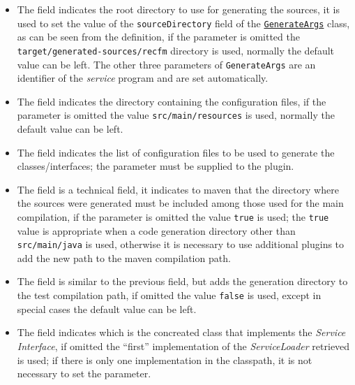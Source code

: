 \begin{itemize}
\item {}
    The  field indicates 
    the root directory to use for generating the sources, it is used to set the 
    value of the \verb!sourceDirectory! field of the 
    \hyperref[lst:GenerateArgs]{\texttt{GenerateArgs}} class, as can be seen 
    from the definition, if the parameter is omitted the 
    \verb!target/generated-sources/recfm! directory is used, normally the 
    default value can be left. 
    The other three parameters of \texttt{GenerateArgs} are an identifier of the 
    \textsl{service} program and are set automatically.
\item {}
    The  field indicates 
    the directory containing the configuration files, if the parameter is 
    omitted the value \verb!src/main/resources! is used, normally the default 
    value can be left.
\item {}
    The  field indicates the list 
    of configuration files to be used to generate the classes/interfaces; the 
    parameter must be supplied to the plugin.
\item {}
    The  field is a 
    technical field, it indicates to maven that the directory where the sources 
    were generated must be included among those used for the main compilation, 
    if the parameter is omitted the value \verb!true! is used; the \verb!true! 
    value is appropriate when a code generation directory other than 
    \verb!src/main/java! is used, otherwise it is necessary to use additional 
    plugins to add the new path to the maven compilation path.
\item {}
    The  field is 
    similar to the previous field, but adds the generation directory to the test 
    compilation path, if omitted the value \verb!false! is used, except in 
    special cases the default value can be left.
\item {}
    The  field 
    indicates which is the concreated class that implements the 
    \textsl{Service Interface}, if omitted the ``first'' implementation of the 
    \textsl{ServiceLoader} retrieved is used; if there is only one 
    implementation in the classpath, it is not necessary to set the parameter.
\end{itemize}
